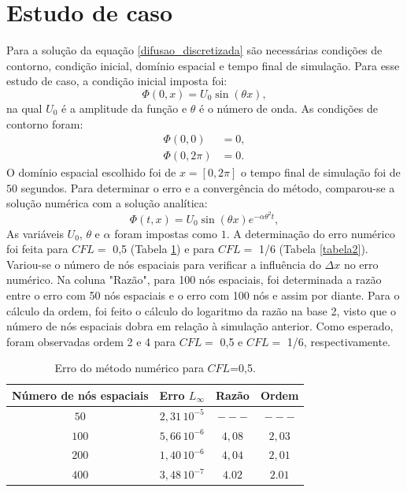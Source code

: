 \documentclass[10pt,twoside,a4paper]{article}
\begin{document}
\section{Estudo de caso} %

Para a solução da equação \ref{difusao_discretizada} são necessárias condições de contorno, condição inicial, domínio espacial e tempo final de simulação. Para esse estudo de caso, a condição inicial imposta foi:
\begin{equation} \label{condicao_inicial}
\Phi(0,x)=U_0 \sin\left(\theta x\right), %
\end{equation}
na qual $U_0$ é a amplitude da função e $\theta$ é o número de onda. As condições de contorno foram:
\begin{equation} \label{condicoes_contorno}
\begin{split}
\Phi(0,0)&=0,\\
\Phi(0,2\pi)&=0.
\end{split}
\end{equation}
O domínio espacial escolhido foi de $x=[0,2\pi]$ o tempo final de simulação foi de $50$ segundos.
Para determinar o erro e a convergência do método, comparou-se a solução numérica com a solução analítica:
\begin{equation} \label{solucao_analitica}
\Phi(t,x)=U_0 \sin\left(\theta x\right) e^{-\alpha \theta^2 t},
\end{equation}
As variáveis $U_0$, $\theta$ e $\alpha$ foram impostas como $1$. A determinação do erro numérico foi feita para $CFL=$ 0,5 (Tabela \ref{tabela1}) e para $CFL=$ 1/6 (Tabela \ref{tabela2}). Variou-se o número de nós espaciais para verificar a influência do $\Delta x$ no erro numérico. Na coluna "Razão", para 100 nós espaciais, foi determinada a razão entre o erro com 50 nós espaciais e o erro com 100 nós e assim por diante. Para o cálculo da ordem, foi feito o cálculo do logaritmo da razão na base 2, visto que o número de nós espaciais dobra em relação à simulação anterior. Como esperado, foram observadas ordem 2 e 4 para $CFL=$ 0,5 e $CFL=$ 1/6, respectivamente.

\begin{table}[h!]
\caption{Erro do método numérico para $CFL$=0,5.}
\label{tabela1}
\centering
\begin{tabular}{cccc}
\hline
Número de nós  espaciais&        Erro $L_\infty$       & Razão      & Ordem    \\ \hline
$50$ &       $2,31 \, 10^{-5}$        & $---$      & $---$    \\ 
$100$ &       $5,66 \, 10^{-6}$        & $4,08$      & $2,03$    \\ 
$200$ &       $1,40 \, 10^{-6}$        & $4,04$      & $2,01$    \\ 
$400$ &       $3,48 \, 10^{-7}$        & $4.02$      & $2.01$    \\ \hline
\end{tabular}
\end{table}
\end{document}
